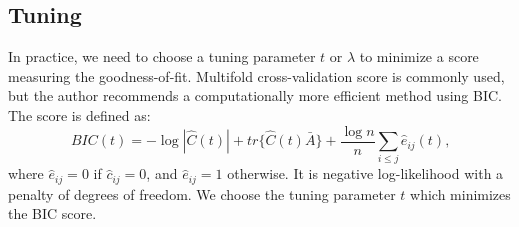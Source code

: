 \documentclass[11pt]{article} %
\begin{document}
\subsection{Tuning}
In practice, we need to choose a tuning parameter $t$ or $\lambda$ to minimize a score measuring the goodness-of-fit. Multifold cross-validation score is commonly used, but the author recommends a computationally more efficient method using BIC. The score is defined as: 
\[BIC(t)=-\log|\hat{C}(t)|+tr\{\hat{C}(t)\bar{A}\}+\frac{\log n}{n}\sum_{i\leq j}\hat{e}_{ij}(t)\mbox{,}\]
where $\hat{e}_{ij}=0$ if $\hat{c}_{ij}=0$, and $\hat{e}_{ij}=1$ otherwise. It is negative log-likelihood with a penalty of degrees of freedom. We choose the tuning parameter $t$ which minimizes the BIC score. 
\end{document}

